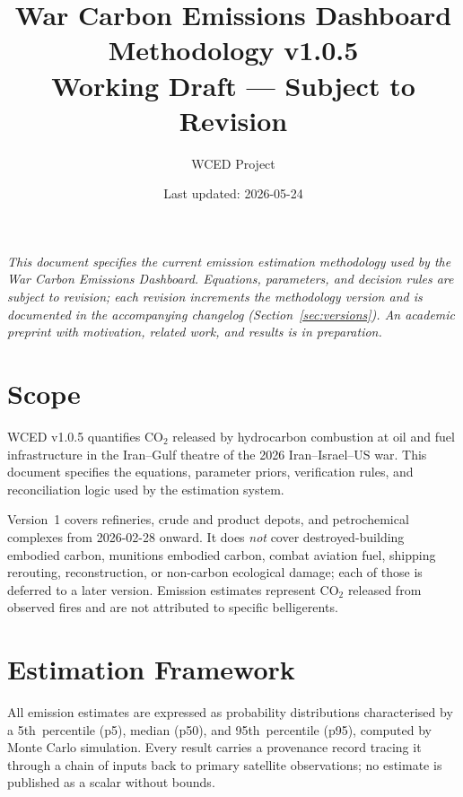 \documentclass[11pt]{article}
\title{War Carbon Emissions Dashboard\\
  \large Methodology v1.0.5\\[0.4em]
  \normalsize\normalfont Working Draft --- Subject to Revision}
\author{WCED Project}
\date{Last updated: 2026-05-24}
\begin{document}
\maketitle

\noindent\emph{This document specifies the current emission estimation
methodology used by the War Carbon Emissions Dashboard. Equations, parameters,
and decision rules are subject to revision; each revision increments the
methodology version and is documented in the accompanying changelog
(Section~\ref{sec:versions}). An academic preprint with motivation, related
work, and results is in preparation.}

\vspace{1em}

\section{Scope}

WCED v1.0.5 quantifies $\mathrm{CO_2}$ released by hydrocarbon combustion
at oil and fuel infrastructure in the Iran--Gulf theatre of the 2026
Iran--Israel--US war. This document specifies the equations, parameter
priors, verification rules, and reconciliation logic used by the estimation
system.

Version~1 covers refineries, crude and product depots, and petrochemical
complexes from 2026-02-28 onward. It does \emph{not} cover
destroyed-building embodied carbon, munitions embodied carbon, combat
aviation fuel, shipping rerouting, reconstruction, or non-carbon ecological
damage; each of those is deferred to a later version. Emission estimates
represent $\mathrm{CO_2}$ released from observed fires and are not
attributed to specific belligerents.

\section{Estimation Framework}

All emission estimates are expressed as probability distributions
characterised by a 5th~percentile (p5), median (p50), and 95th~percentile
(p95), computed by Monte Carlo simulation. Every result carries a
provenance record tracing it through a chain of inputs back to primary
satellite observations; no estimate is published as a scalar without bounds.
\end{document}

